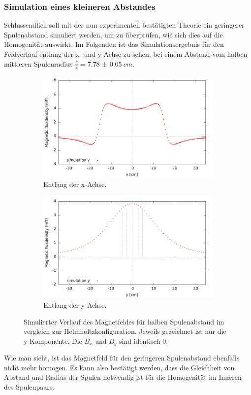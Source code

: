 \documentclass[12pt,a4paper]{article}
\begin{document}
\subsubsection*{Simulation eines kleineren Abstandes}
Schlussendlich soll mit der nun experimentell bestätigten Theorie ein geringerer Spulenabstand simuliert werden, um zu überprüfen, wie sich dies auf die Homogenität auswirkt. Im Folgenden ist das Simulationsergebnis für den Feldverlauf entlang der x- und y-Achse zu sehen, bei einem Abstand vom halben mittleren Spulenradius $\frac{\bar{r}}{2}=\SI{7.78(5)}{cm}$.
\begin{figure}[H]
	\centering
	\begin{subfigure}[c]{0.46\textwidth}
		\centering
		\includegraphics[scale=0.6]{plot00.pdf}
		\caption{Entlang der x-Achse.}
	\end{subfigure}
	\hspace{0.04\textwidth}
	\begin{subfigure}[c]{0.46\textwidth}
		\centering
		\includegraphics[scale=0.6]{plot01.pdf}
		\caption{Entlang der y-Achse.}
	\end{subfigure}
\caption{Simulierter Verlauf des Magnetfeldes für halben Spulenabstand im vergleich zur Helmholtzkonfiguration. Jeweils gezeichnet ist nur die y-Komponente. Die $B_x$ und $B_y$ sind identisch 0.}
\end{figure}
Wie man sieht, ist das Magnetfeld für den geringeren Spulenabstand ebenfalls nicht mehr homogen. Es kann also bestätigt werden, dass die Gleichheit von Abstand und Radius der Spulen notwendig ist für die Homogenität im Inneren des Spulenpaars.
\end{document}
